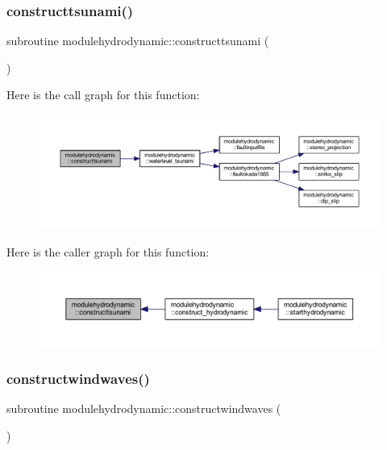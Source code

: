 \subsubsection{\texorpdfstring{constructtsunami()}{constructtsunami()}}
{\footnotesize\ttfamily subroutine modulehydrodynamic\+::constructtsunami (\begin{DoxyParamCaption}{ }\end{DoxyParamCaption})\hspace{0.3cm}{\ttfamily [private]}}

Here is the call graph for this function\+:\nopagebreak
\begin{figure}[H]
\begin{center}
\leavevmode
\includegraphics[width=350pt]{namespacemodulehydrodynamic_a4884a32bf5be45ca0a9b657f2998efa7_cgraph}
\end{center}
\end{figure}
Here is the caller graph for this function\+:\nopagebreak
\begin{figure}[H]
\begin{center}
\leavevmode
\includegraphics[width=350pt]{namespacemodulehydrodynamic_a4884a32bf5be45ca0a9b657f2998efa7_icgraph}
\end{center}
\end{figure}
\mbox{\label{namespacemodulehydrodynamic_acf1676d4429b32307257ed7006fc59e1}} 
\subsubsection{\texorpdfstring{constructwindwaves()}{constructwindwaves()}}
{\footnotesize\ttfamily subroutine modulehydrodynamic\+::constructwindwaves (\begin{DoxyParamCaption}{ }\end{DoxyParamCaption})\hspace{0.3cm}{\ttfamily [private]}}

